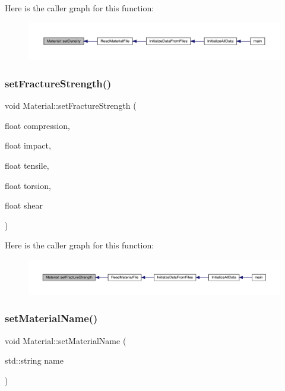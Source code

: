 Here is the caller graph for this function\+:
\nopagebreak
\begin{figure}[H]
\begin{center}
\leavevmode
\includegraphics[width=350pt]{dc/dee/class_material_ab7aca2e9daaf35b5b8a45ee677c07073_icgraph}
\end{center}
\end{figure}
\mbox{\label{class_material_a9c2547bdd4f225f9ad2351b8c2ad7c7e}} 
\subsubsection{\texorpdfstring{set\+Fracture\+Strength()}{setFractureStrength()}}
{\footnotesize\ttfamily void Material\+::set\+Fracture\+Strength (\begin{DoxyParamCaption}\item[{float}]{compression,  }\item[{float}]{impact,  }\item[{float}]{tensile,  }\item[{float}]{torsion,  }\item[{float}]{shear }\end{DoxyParamCaption})}

Here is the caller graph for this function\+:
\nopagebreak
\begin{figure}[H]
\begin{center}
\leavevmode
\includegraphics[width=350pt]{dc/dee/class_material_a9c2547bdd4f225f9ad2351b8c2ad7c7e_icgraph}
\end{center}
\end{figure}
\mbox{\label{class_material_ab73b88e094cf38d28f9addfd12357b04}} 
\subsubsection{\texorpdfstring{set\+Material\+Name()}{setMaterialName()}}
{\footnotesize\ttfamily void Material\+::set\+Material\+Name (\begin{DoxyParamCaption}\item[{std\+::string}]{name }\end{DoxyParamCaption})}

